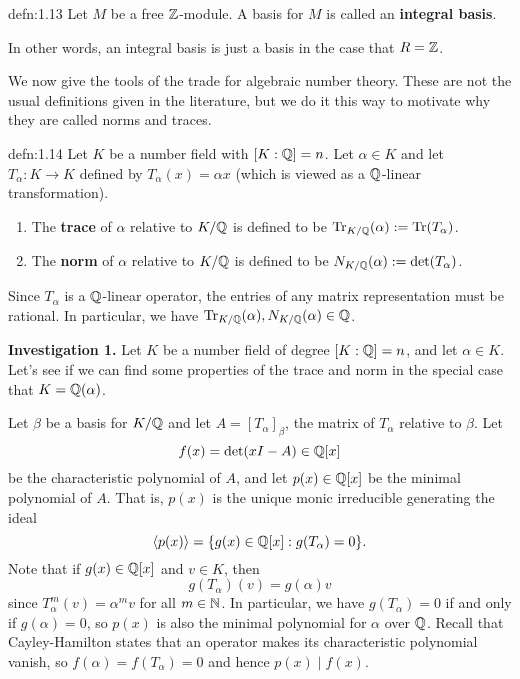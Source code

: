 \begin{defn}{defn:1.13}
    Let $M$ be a free $\mathbb{Z}$-module. A basis for $M$ is called an 
    {\bf integral basis}.
\end{defn}\vspace{-0.25cm}

In other words, an integral basis is just a basis in the case that $R = \mathbb{Z}$.

We now give the tools of the trade for algebraic number theory. These are 
not the usual definitions given in the literature, but we do it this way to 
motivate why they are called norms and traces.

\begin{defn}{defn:1.14}
    Let $K$ be a number field with $[K : \mathbb{Q}] = n$. Let 
    $\alpha \in K$ and let $T_\alpha : K \to K$ defined by 
    $T_\alpha(x) = \alpha x$ (which is viewed as a $\mathbb{Q}$-linear transformation).
    \begin{enumerate}[(1)]
        \item The {\bf trace} of $\alpha$ relative to $K/\mathbb{Q}$ is defined to be
        $\operatorname{Tr}_{K/\mathbb{Q}}(\alpha) := \operatorname{Tr}(T_\alpha)$.
        \item The {\bf norm} of $\alpha$ relative to $K/\mathbb{Q}$ is defined to be
        $N_{K/\mathbb{Q}}(\alpha) := \det(T_\alpha)$.
    \end{enumerate}
\end{defn}\vspace{-0.25cm}

Since $T_\alpha$ is a $\mathbb{Q}$-linear operator, the entries of any matrix 
representation must be rational. In particular, we have $\operatorname{Tr}_{K/\mathbb{Q}}(\alpha), 
N_{K/\mathbb{Q}}(\alpha) \in \mathbb{Q}$.

{\bf Investigation 1.} Let $K$ be a number field of degree $[K : \mathbb{Q}] = n$,
and let $\alpha \in K$. Let's see if we can find some properties of 
the trace and norm in the special case that $K = \mathbb{Q}(\alpha)$.

Let $\beta$ be a basis for $K/\mathbb{Q}$ and let $A = [T_\alpha]_\beta$, the matrix 
of $T_\alpha$ relative to $\beta$. Let
\[ f(x) = \det(xI - A) \in \mathbb{Q}[x] \] 
be the characteristic polynomial of $A$, and let $p(x) \in \mathbb{Q}[x]$ be the minimal 
polynomial of $A$. That is, $p(x)$ is the unique monic irreducible 
generating the ideal 
\[ \langle p(x) \rangle = \{g(x) \in \mathbb{Q}[x] : g(T_\alpha) = 0\}. \] 
Note that if $g(x) \in \mathbb{Q}[x]$ and $v \in K$, then 
\[ g(T_\alpha)(v) = g(\alpha) v \] 
since $T_\alpha^m(v) = \alpha^m v$ for all $m \in \mathbb{N}$. In particular, we have 
$g(T_\alpha) = 0$ if and only if $g(\alpha) = 0$, so $p(x)$ is also the 
minimal polynomial for $\alpha$ over $\mathbb{Q}$. Recall that Cayley-Hamilton 
states that an operator makes its characteristic polynomial vanish, so 
$f(\alpha) = f(T_\alpha) = 0$ and hence $p(x) \mid f(x)$.

